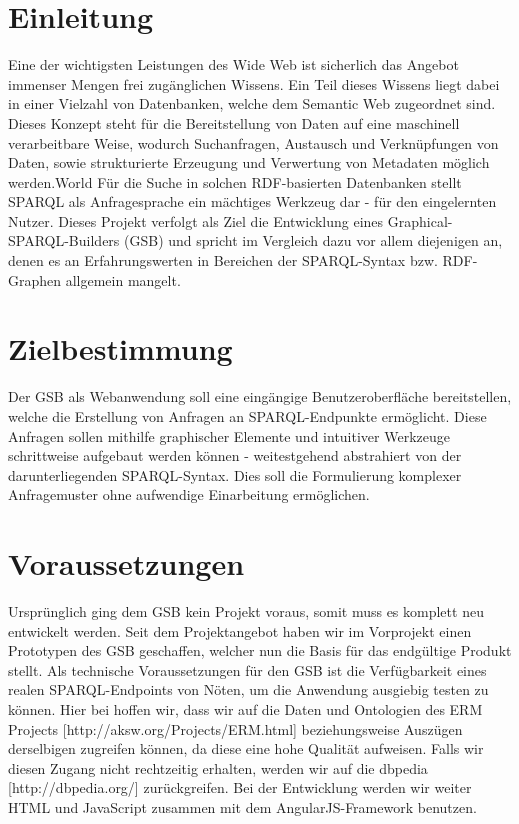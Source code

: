
\section{Einleitung}
Eine der wichtigsten Leistungen des Wide Web ist sicherlich das Angebot immenser Mengen frei zugänglichen Wissens. Ein Teil dieses Wissens liegt dabei in einer Vielzahl von Datenbanken, welche dem Semantic Web zugeordnet sind. Dieses Konzept steht für die Bereitstellung von Daten auf eine maschinell verarbeitbare Weise, wodurch Suchanfragen, Austausch und Verknüpfungen von Daten, sowie strukturierte Erzeugung und Verwertung von Metadaten möglich werden.World 
Für die Suche in solchen RDF-basierten Datenbanken stellt SPARQL als Anfragesprache ein mächtiges Werkzeug dar - für den eingelernten Nutzer. Dieses Projekt verfolgt als Ziel die Entwicklung eines Graphical-SPARQL-Builders (GSB) und spricht im Vergleich dazu vor allem diejenigen an, denen es an Erfahrungswerten in Bereichen der SPARQL-Syntax bzw. RDF-Graphen allgemein mangelt.

\section{Zielbestimmung}
Der GSB als Webanwendung soll eine eingängige Benutzeroberfläche
bereitstellen, welche die Erstellung von Anfragen an SPARQL-Endpunkte
ermöglicht. Diese Anfragen sollen mithilfe graphischer Elemente und
intuitiver Werkzeuge schrittweise aufgebaut werden können -
weitestgehend abstrahiert von der darunterliegenden
SPARQL-Syntax. Dies soll die Formulierung komplexer Anfragemuster ohne
aufwendige Einarbeitung ermöglichen.

\section{Voraussetzungen}
Ursprünglich ging dem GSB kein Projekt voraus, somit muss es komplett neu entwickelt werden. Seit dem Projektangebot haben wir im Vorprojekt einen Prototypen des GSB geschaffen, welcher nun die Basis für das endgültige Produkt stellt.
Als technische Voraussetzungen für den GSB ist die Verfügbarkeit eines realen SPARQL-Endpoints von Nöten, um die Anwendung ausgiebig testen zu können. Hier bei hoffen wir, dass wir auf die Daten und Ontologien des ERM Projects [http://aksw.org/Projects/ERM.html] beziehungsweise Auszügen derselbigen zugreifen können, da diese eine hohe Qualität aufweisen. Falls wir diesen Zugang nicht rechtzeitig erhalten, werden wir auf die dbpedia [http://dbpedia.org/] zurückgreifen.
Bei der Entwicklung werden wir weiter HTML und JavaScript zusammen mit
dem AngularJS-Framework benutzen.


